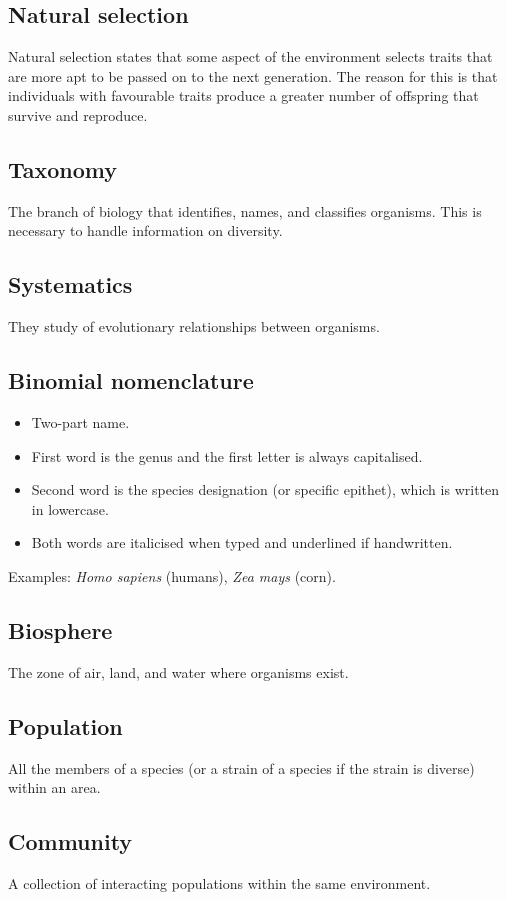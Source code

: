 \documentclass[11pt]{article}
\begin{document}
\subsection{Natural selection}
\label{sec:org58e2346}
Natural selection states that some aspect of the environment selects traits that are more apt to be passed on to the next generation. The reason for this is that individuals with favourable traits produce a greater number of offspring that survive and reproduce.
\subsection{Taxonomy}
\label{sec:org9a61f07}
The branch of biology that identifies, names, and classifies organisms. This is necessary to handle information on diversity.
\subsection{Systematics}
\label{sec:orgae03821}
They study of evolutionary relationships between organisms.
\subsection{Binomial nomenclature}
\label{sec:org54a456f}
\begin{itemize}
\item Two-part name.
\item First word is the genus and the first letter is always capitalised.
\item Second word is the species designation (or specific epithet), which is written in lowercase.
\item Both words are italicised when typed and underlined if handwritten.
\end{itemize}

Examples: \emph{Homo sapiens} (humans), \emph{Zea mays} (corn).
\subsection{Biosphere}
\label{sec:org20ba750}
The zone of air, land, and water where organisms exist.
\subsection{Population}
\label{sec:org8ffc290}
All the members of a species (or a strain of a species if the strain is diverse) within an area.
\subsection{Community}
\label{sec:org1e8ebea}
A collection of interacting populations within the same environment.
\end{document}
